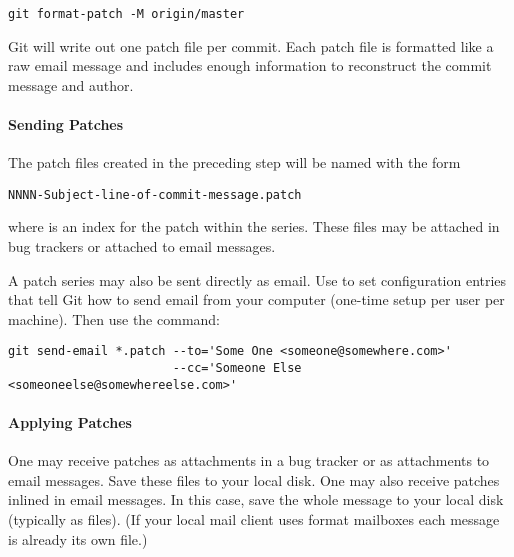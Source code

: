 \begin{verbatim}
git format-patch -M origin/master
\end{verbatim}

Git will write out one patch file per commit. Each patch file is formatted like
a raw email message and includes enough information to reconstruct the commit
message and author.


\paragraph{Sending Patches}
\label{par:SendingPatches}

The patch files created in the preceding step will be named with the form

\begin{verbatim}
NNNN-Subject-line-of-commit-message.patch
\end{verbatim}

where  is an index for the patch within the series. These files may
be attached in bug trackers or attached to email messages.

A patch series may also be sent directly as email. Use
 to set  configuration entries that
tell Git how to send email from your computer (one-time setup per user per
machine). Then use the  command:

\begin{verbatim}
git send-email *.patch --to='Some One <someone@somewhere.com>' 
                       --cc='Someone Else <someoneelse@somewhereelse.com>'
\end{verbatim}


\paragraph{Applying Patches}
\label{par:ApplyingPatches}

One may receive patches as attachments in a bug tracker or as attachments to
email messages. Save these files to your local disk. One may also receive
patches inlined in email messages. In this case, save the whole message to your
local disk (typically as  files). (If your local mail client uses
 format mailboxes each message is already its own file.)

